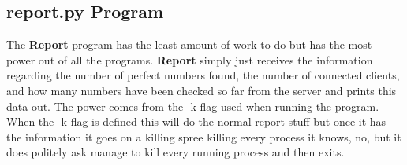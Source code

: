 \documentclass[letterpaper,10pt,notitlepage,fleqn]{article}
\begin{document}
\subsection*{report.py Program}
The \textbf{Report} program has the least amount of work to do but has the most power out of all the programs. \textbf{Report} simply just receives the information regarding the number of perfect numbers found, the number of connected clients, and how many numbers have been checked so far from the server and prints this data out. The power comes from the -k flag used when running the program. When the -k flag is defined this will do the normal report stuff but once it has the information it goes on a killing spree killing every process it knows, no, but it does politely ask manage to kill every running process and then exits. 
\scalebox{1} %
\end{document}
